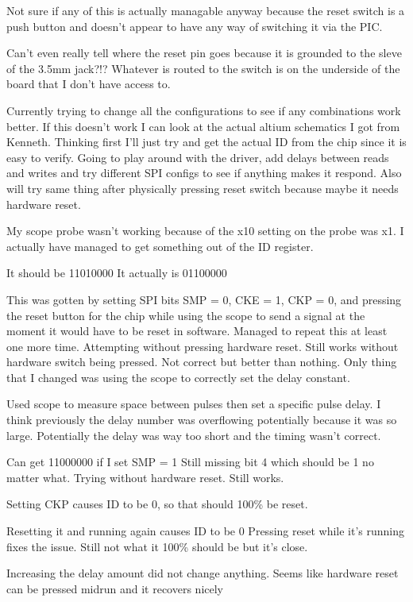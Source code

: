 Not sure if any of this is actually managable anyway because the reset switch
is a push button and doesn't appear to have any way of switching it via the PIC.

Can't even really tell where the reset pin goes because it is grounded to the sleve of
the 3.5mm jack?!? Whatever is routed to the switch is on the underside of the board
that I don't have access to.

Currently trying to change all the configurations to see if any combinations work better.
If this doesn't work I can look at the actual altium schematics I got from Kenneth.
Thinking first I'll just try and get the actual ID from the chip
since it is easy to verify.
Going to play around with the driver, add delays between reads and writes and try different
SPI configs to see if anything makes it respond.
Also will try same thing after physically pressing reset switch because maybe it needs
hardware reset.

My scope probe wasn't working because of the x10 setting on the probe was x1.
I actually have managed to get something out of the ID register.

It should be    11010000
It actually is  01100000

This was gotten by setting SPI bits SMP = 0, CKE = 1, CKP = 0, and pressing
the reset button for the chip while using the scope to send a signal at the moment it
would have to be reset in software.
Managed to repeat this at least one more time. Attempting without pressing hardware reset.
Still works without hardware switch being pressed. Not correct but better than nothing.
Only thing that I changed was using the scope to correctly set the delay constant.

Used scope to measure space between pulses then set a specific pulse delay.
I think previously the delay number was overflowing potentially because it was so large.
Potentially the delay was way too short and the timing wasn't correct.

Can get 11000000 if I set SMP = 1
Still missing bit 4 which should be 1 no matter what.
Trying without hardware reset. Still works.

Setting CKP causes ID to be 0, so that should 100\% be reset.

Resetting it and running again causes ID to be 0
Pressing reset while it's running fixes the issue.
Still not what it 100\% should be but it's close.

Increasing the delay amount did not change anything.
Seems like hardware reset can be pressed midrun and it recovers nicely

